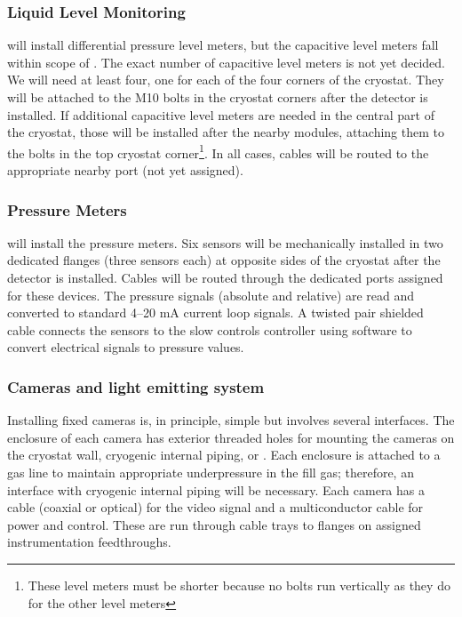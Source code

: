 \subsubsection{Liquid Level Monitoring}
\label{sec:fdgen-slow-cryo-install-llm}


 will install differential pressure level meters, but the capacitive level meters fall within scope of . The exact number of capacitive level meters is not yet decided. We will need at least four, one for each of the four corners of the cryostat.  
They will be attached to the M10 bolts in the cryostat corners after the detector is installed. If additional capacitive level meters are needed in the central part of the cryostat, those will be installed after the nearby  modules, attaching them to the bolts in the top cryostat corner\footnote{These level meters must be shorter because no bolts run vertically as they do for the other level meters}. In all cases, cables will be routed to the appropriate nearby port (not yet assigned). 

\subsubsection{Pressure Meters}
\label{sec:fdgen-slow-cryo-install-press}
 will install the pressure meters. Six sensors will be mechanically installed in two dedicated flanges (three sensors each) at opposite sides of the cryostat after the detector is installed. Cables will be routed through the dedicated ports assigned for these devices. The pressure signals (absolute and relative) are read and converted to
standard 4--20 mA current loop signals.
A twisted pair shielded cable connects the sensors to the slow controls  controller using software to convert electrical signals to pressure values.

\subsubsection{Cameras and light emitting system}
\label{sec:fdgen-slow-cryo-install-c}


Installing fixed cameras is, in principle, simple but involves several interfaces. The enclosure of each camera has
exterior threaded holes for mounting the cameras on the cryostat wall,
cryogenic internal piping, or . Each
enclosure %
is attached to a gas line to maintain appropriate
underpressure in the fill gas; %
therefore, an interface with cryogenic
internal piping will be necessary. Each camera has a cable (coaxial or
optical) for the video signal and a multiconductor cable for power and
control. These %
are run through cable trays to flanges on assigned
instrumentation feedthroughs.

